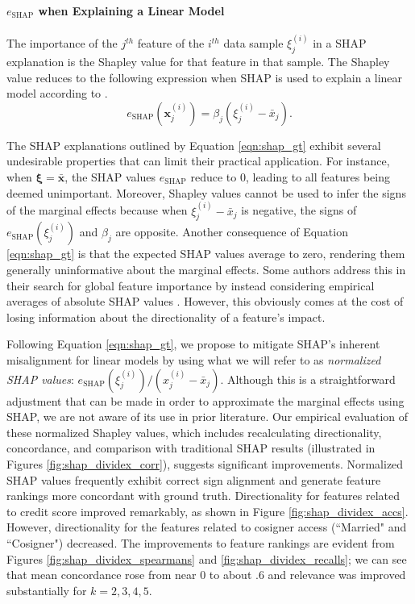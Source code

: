 \documentclass[12pt]{article}  %
\begin{document}
         \paragraph{$e_{\text{SHAP}}$ when Explaining a Linear Model}
              The importance of the $j^{th}$ feature of the $i^{th}$ data sample $\xi^{(i)}_j$ in a SHAP explanation is the Shapley value for that feature in that sample. The Shapley value reduces to the following expression when SHAP is used to explain a linear model according to \cite{StrumbeljErik2014Epma,lundberg17shap}. 
             \begin{equation}
                \label{eqn:shap_gt}
                e_\text{SHAP}(\mathbf{x}^{(i)}_j) = \beta_j (\xi^{(i)}_j - \bar{x}_j).
             \end{equation}

            
The SHAP explanations outlined by Equation \ref{eqn:shap_gt} exhibit several undesirable properties that can limit their practical application. For instance, when $\boldsymbol{\xi}=\bar{\mathbf{x}}$, the SHAP values $e_\text{SHAP}$ reduce to 0, leading to all features being deemed unimportant. Moreover, Shapley values cannot be used to infer the signs of the marginal effects because when $\xi^{(i)}_j - \bar{x}_j$ is negative, the signs of $e_{\text{SHAP}}(\xi^{(i)}_j)$ and $\beta_j$ are opposite. Another consequence of Equation \ref{eqn:shap_gt}  is that the expected SHAP values average to zero, rendering them generally uninformative about the marginal effects. Some authors address this in their search for global feature importance by instead considering empirical averages of absolute SHAP values \citep{lenaers23rent,maeng23vr,guenther2023useful}. However, this obviously comes at the cost of losing information about the directionality of a feature's impact.

             Following Equation \ref{eqn:shap_gt}, we propose to mitigate SHAP's inherent misalignment for linear models by using what we will refer to as \emph{normalized SHAP values}: $e_{\text{SHAP}}(\xi^{(i)}_j) / (x^{(i)}_j - \bar{x}_j)$. Although this is a straightforward adjustment that can be made in order to approximate the marginal effects using SHAP, we are not aware of its use in prior literature.  Our empirical evaluation of these normalized Shapley values, which includes recalculating directionality, concordance, and comparison with traditional SHAP results (illustrated in Figures \ref{fig:shap_dividex_corr}), suggests significant improvements. Normalized SHAP values frequently exhibit correct sign alignment and generate feature rankings more concordant with ground truth. Directionality for features related to credit score improved remarkably, as shown in Figure \ref{fig:shap_dividex_accs}. However, directionality for the features related to cosigner access (``Married" and ``Cosigner") decreased. The improvements to feature rankings are evident from Figures \ref{fig:shap_dividex_spearmans} and \ref{fig:shap_dividex_recalls}; we can see that mean concordance rose from near 0 to about .6 and relevance was improved substantially for $k=2,3,4,5$. 
             
\end{document}
